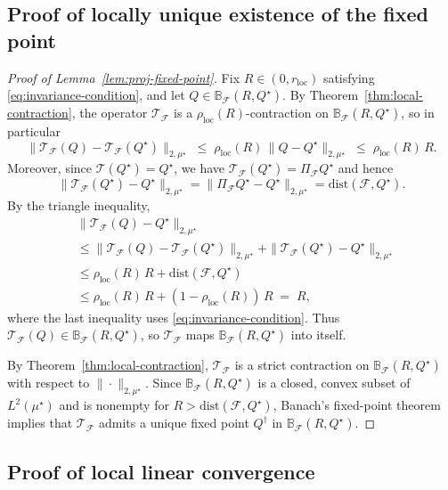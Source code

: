 \documentclass{article}
\theoremstyle{plain}
\theoremstyle{definition}
\theoremstyle{remark}
\begin{document}
\subsection{Proof of locally unique existence of the fixed point}
\begin{proof}[Proof of Lemma~\ref{lem:proj-fixed-point}]
Fix \(R \in (0,r_{\mathrm{loc}})\) satisfying \eqref{eq:invariance-condition}, and let
$Q \in \mathbb{B}_{\mathcal F}(R,Q^\star)$. By
Theorem~\ref{thm:local-contraction}, the operator
$\mathcal T_{\mathcal F}$ is a $\rho_{\mathrm{loc}}(R)$-contraction on
$\mathbb{B}_{\mathcal F}(R,Q^\star)$, so in particular
\[
\|\mathcal T_{\mathcal F}(Q) - \mathcal T_{\mathcal F}(Q^\star)\|_{2,\mu^\star}
\;\le\;
\rho_{\mathrm{loc}}(R)\,\|Q - Q^\star\|_{2,\mu^\star}
\;\le\;
\rho_{\mathrm{loc}}(R)\,R.
\]
Moreover, since $\mathcal T(Q^\star) = Q^\star$, we have
$\mathcal T_{\mathcal F}(Q^\star) = \Pi_{\mathcal F}Q^\star$ and hence
\[
\|\mathcal T_{\mathcal F}(Q^\star) - Q^\star\|_{2,\mu^\star}
=
\|\Pi_{\mathcal F}Q^\star - Q^\star\|_{2,\mu^\star}
=
\mathrm{dist}(\mathcal F, Q^\star).
\]
By the triangle inequality,
\begin{align*}
&\|\mathcal T_{\mathcal F}(Q) - Q^\star\|_{2,\mu^\star}\\
&\le
\|\mathcal T_{\mathcal F}(Q) - \mathcal T_{\mathcal F}(Q^\star)\|_{2,\mu^\star}
+
\|\mathcal T_{\mathcal F}(Q^\star) - Q^\star\|_{2,\mu^\star}
\\
&\le
\rho_{\mathrm{loc}}(R)\,R + \mathrm{dist}(\mathcal F, Q^\star)
\\
&\le
\rho_{\mathrm{loc}}(R)\,R + (1-\rho_{\mathrm{loc}}(R))\,R
\;=\;
R,
\end{align*}
where the last inequality uses \eqref{eq:invariance-condition}. Thus
$\mathcal T_{\mathcal F}(Q) \in \mathbb{B}_{\mathcal F}(R,Q^\star)$, so
$\mathcal T_{\mathcal F}$ maps $\mathbb{B}_{\mathcal F}(R,Q^\star)$ into itself.

By Theorem~\ref{thm:local-contraction},
$\mathcal T_{\mathcal F}$ is a strict contraction on
$\mathbb{B}_{\mathcal F}(R,Q^\star)$ with respect to $\|\cdot\|_{2,\mu^\star}$.
Since $\mathbb{B}_{\mathcal F}(R,Q^\star)$ is a closed, convex subset of
$L^2(\mu^\star)$ and is nonempty for \(R > \mathrm{dist}(\mathcal F, Q^\star)\),
Banach's fixed-point theorem implies that $\mathcal T_{\mathcal F}$ admits a
unique fixed point $Q^\dagger$ in
$\mathbb{B}_{\mathcal F}(R,Q^\star)$.
\end{proof}

\subsection{Proof of local linear convergence}
\end{document}
